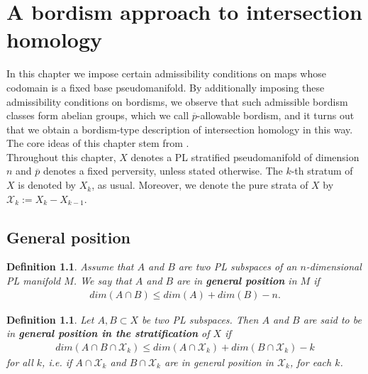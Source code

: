 \documentclass{scrreprt}
\newtheorem{definition}[prop]{Definition}
\begin{document}
\chapter{A bordism approach to intersection homology}\label{IOmega}
In this chapter we impose certain admissibility conditions on maps whose codomain is a fixed base pseudomanifold. By additionally imposing these admissibility conditions on bordisms, we observe that such admissible bordism classes form abelian groups, which we call $\overline{p}$-allowable bordism, and it turns out that we obtain a bordism-type description of intersection homology in this way. The core ideas of this chapter stem from \cite{comezana}. \\
Throughout this chapter, $X$ denotes a PL stratified pseudomanifold of dimension $n$ and $\overline{p}$ denotes a fixed perversity, unless stated otherwise. The $k$-th stratum of $X$ is denoted by $X_k$, as usual. Moreover, we denote the pure strata of $X$ by $\mathcal{X}_k:= X_k - X_{k-1}$.

\section{General position}

\begin{definition}
Assume that $A$ and $B$ are two PL subspaces of an $n$-dimensional PL manifold $M$. We say that $A$ and $B$ are in \textbf{general position} in $M$ if 
\begin{align*}
dim(A \cap B) \leq dim(A) + dim(B) - n.
\end{align*}
\end{definition}

\begin{definition}
Let $A,B \subset X$ be two PL subspaces. Then $A$ and $B$ are said to be in \textbf{general position in the stratification } of $X$ if
\begin{align*}
dim(A \cap B \cap \mathcal{X}_k) \leq dim(A \cap \mathcal{X}_k) + dim(B \cap \mathcal{X}_k) -k
\end{align*}
for all $k$, i.e. if $A \cap \mathcal{X}_k$ and $B \cap \mathcal{X}_k$ are in general position in $\mathcal{X}_k$, for each $k$.
\end{definition}
\end{document}
